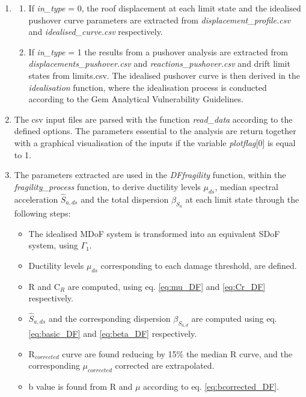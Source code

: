 \begin{enumerate}
\item 
\begin{enumerate}
\item If \textit{in\_type} = 0, the roof displacement at each limit state and the idealised pushover curve parameters are extracted from \textit{displacement\_profile.csv} and \textit{idealised\_curve.csv} respectively.

\item If \textit{in\_type} = 1 the results from a pushover analysis are extracted from \textit{displacements\_pushover.csv} and \textit{reactions\_pushover.csv} and drift limit states from {limits.csv}. The idealised pushover curve is then derived in the \textit{idealisation} function, where the idealisation process is conducted according to the Gem Analytical Vulnerability Guidelines.	\end{enumerate}

\item The csv input files are parsed with the function \textit{read\_data} according to the defined options. The parameters essential to the analysis are return together with a graphical visualisation of the inputs if the variable \textit{plotflag}[0] is equal to 1.

\item The parameters extracted are used in the \textit{DFfragility} function, within the \textit{fragility\_process} function, to derive ductility levels $\mu_{ds}$, median spectral acceleration $\hat{S}_{a,ds}$ and the total dispersion $\beta_{S_a}$ at each limit state through the following steps:
\begin{itemize}
\item The idealised MDoF system is transformed into an equivalent SDoF system, using $\Gamma_1$.
\item Ductility levels $\mu_{ds}$ corresponding to each damage threshold, are defined.
\item R and C$_R$ are computed, using eq. \ref{eq:mu_DF} and \ref{eq:Cr_DF} respectively.
\item $\hat{S}_{a,ds}$ and the corresponding dispersion  $\beta_{S_{a, d}}$ are computed using eq. \ref{eq:basic_DF} and \ref{eq:beta_DF} respectively.
\item R$_{corrected}$ curve are found reducing by 15\% the median R curve, and the corresponding $\mu_{corrected}$ corrected are extrapolated.
\item b value is found from R and $\mu$ according to eq. \ref{eq:bcorrected_DF}.


\end{itemize}
\end{enumerate}

